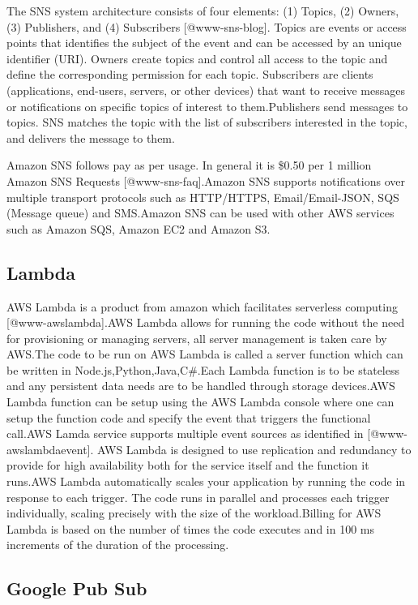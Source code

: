 The SNS system architecture consists of four elements: (1) Topics, (2)
Owners, (3) Publishers, and (4)
Subscribers [@www-sns-blog]. Topics are events or access points
that identifies the subject of the event and can be accessed by an
unique identifier (URI). Owners create topics and control all access
to the topic and define the corresponding permission for each
topic. Subscribers are clients (applications, end-users, servers, or
other devices) that want to receive messages or notifications on
specific topics of interest to them.Publishers send messages to
topics. SNS matches the topic with the list of subscribers interested
in the topic, and delivers the message to them.

Amazon SNS follows pay as per usage. In general it is \$0.50 per 1
million Amazon SNS Requests [@www-sns-faq].Amazon SNS supports
notifications over multiple transport protocols such as HTTP/HTTPS,
Email/Email-JSON, SQS (Message queue) and SMS.Amazon SNS can be used
with other AWS services such as Amazon SQS, Amazon EC2 and Amazon S3.



\subsection{Lambda}

AWS Lambda is a product from amazon which facilitates serverless
computing [@www-awslambda].AWS Lambda allows for running the code
without the need for provisioning or managing servers, all server
management is taken care by AWS.The code to be run on AWS Lambda is
called a server function which can be written in
Node.js,Python,Java,C\#.Each Lambda function is to be stateless and
any persistent data needs are to be handled through storage
devices.AWS Lambda function can be setup using the AWS Lambda console
where one can setup the function code and specify the event that
triggers the functional call.AWS Lamda service supports multiple event
sources as identified in [@www-awslambdaevent]. AWS Lambda is
designed to use replication and redundancy to provide for high
availability both for the service itself and the function it runs.AWS
Lambda automatically scales your application by running the code in
response to each trigger. The code runs in parallel and processes each
trigger individually, scaling precisely with the size of the
workload.Billing for AWS Lambda is based on the number of times the
code executes and in 100 ms increments of the duration of the
processing.

\subsection{Google Pub Sub}

